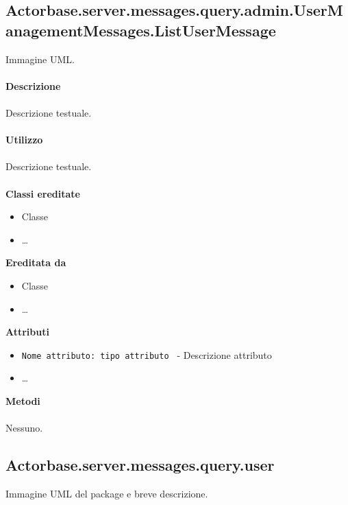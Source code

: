 \documentclass[a4paper]{article}
\begin{document}
	\subsection{Actorbase.server.messages.query.admin.UserManagementMessages.ListUserMessage}
		Immagine UML.
		\\ \\
		\textbf{Descrizione}
			\\ \\
			Descrizione testuale.
			\\ \\
		\textbf{Utilizzo}
			\\ \\
			Descrizione testuale.
			\\ \\
		\textbf{Classi ereditate}
			\begin{itemize}
				\item Classe
				\item \dots
			\end{itemize}
		\textbf{Ereditata da}
			\begin{itemize}
				\item Classe
				\item \dots
			\end{itemize}
		\textbf{Attributi}
			\begin{itemize}
				\item \texttt{Nome attributo: tipo attributo } - Descrizione attributo
				\item \dots
			\end{itemize}
		\textbf{Metodi}
			\\ \\
			Nessuno.	
			
	\subsection{Actorbase.server.messages.query.user}
		Immagine UML del package e breve descrizione.
		
\end{document}
